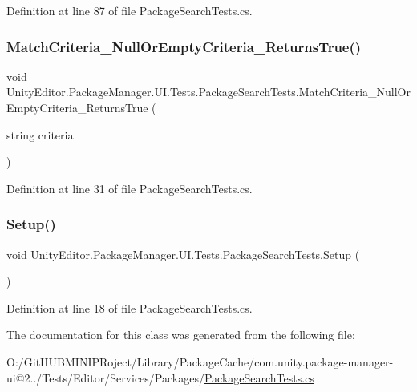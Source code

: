 Definition at line 87 of file Package\+Search\+Tests.\+cs.

\mbox{\label{class_unity_editor_1_1_package_manager_1_1_u_i_1_1_tests_1_1_package_search_tests_a09426b3f6170cb8d9a1afbdcfb38842c}} 
\subsubsection{\texorpdfstring{MatchCriteria\_NullOrEmptyCriteria\_ReturnsTrue()}{MatchCriteria\_NullOrEmptyCriteria\_ReturnsTrue()}}
{\footnotesize\ttfamily void Unity\+Editor.\+Package\+Manager.\+U\+I.\+Tests.\+Package\+Search\+Tests.\+Match\+Criteria\+\_\+\+Null\+Or\+Empty\+Criteria\+\_\+\+Returns\+True (\begin{DoxyParamCaption}\item[{string}]{criteria }\end{DoxyParamCaption})}



Definition at line 31 of file Package\+Search\+Tests.\+cs.

\mbox{\label{class_unity_editor_1_1_package_manager_1_1_u_i_1_1_tests_1_1_package_search_tests_ae0af173d00abe16f5507a58042c4f4c7}} 
\subsubsection{\texorpdfstring{Setup()}{Setup()}}
{\footnotesize\ttfamily void Unity\+Editor.\+Package\+Manager.\+U\+I.\+Tests.\+Package\+Search\+Tests.\+Setup (\begin{DoxyParamCaption}{ }\end{DoxyParamCaption})}



Definition at line 18 of file Package\+Search\+Tests.\+cs.



The documentation for this class was generated from the following file\+:\begin{DoxyCompactItemize}
\item 
O\+:/\+Git\+H\+U\+B\+M\+I\+N\+I\+P\+Roject/\+Library/\+Package\+Cache/com.\+unity.\+package-\/manager-\/ui@2../\+Tests/\+Editor/\+Services/\+Packages/\mbox{\hyperlink{_package_search_tests_8cs}{Package\+Search\+Tests.\+cs}}\end{DoxyCompactItemize}

